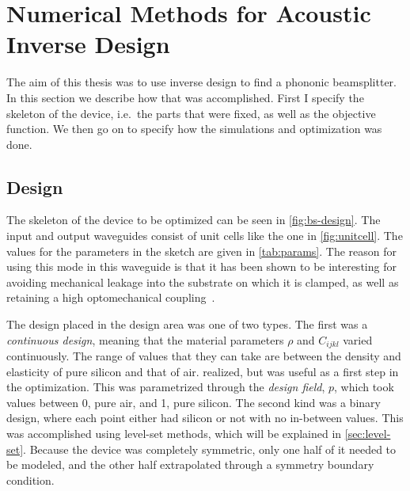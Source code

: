 \chapter{Numerical Methods for Acoustic Inverse Design}\label{sec:methods}

The aim of this thesis was to use inverse design to find a phononic
beamsplitter. In this section we describe how that was accomplished. First I
specify the skeleton of the device, i.e.\ the parts that were fixed, as well as
the objective function. We then go on to specify how the simulations and
optimization was done.

\section{Design}

The skeleton of the device to be optimized can be seen in \cref{fig:bs-design}.
The input and output waveguides consist of unit cells like the one in
\cref{fig:unitcell}.
The values for the parameters in the sketch are given in \cref{tab:params}.
The reason for using this mode in this waveguide is that it has been shown to be
interesting for avoiding mechanical leakage into the substrate on which it is
clamped, as well as retaining a high optomechanical
coupling~\cite{kolvik_clamped_2023}.

The design placed in the design area was one of two types.
The first was a \emph{continuous design}, meaning that the material parameters
$\rho$ and $C_{ijkl}$ varied continuously. The range of values that they
can take are between the density and elasticity of pure silicon and that of air.
realized, but was useful as a first step in the optimization.
This was parametrized through the \emph{design field}, $p$, which took values
between 0, pure air, and 1, pure silicon.
The second kind was a binary design, where each point either had silicon or not
with no in-between values.
This was accomplished using level-set methods, which will be explained in
\cref{sec:level-set}.
Because the device was completely symmetric, only one half of it needed to be
modeled, and the other half extrapolated through a symmetry boundary condition.

